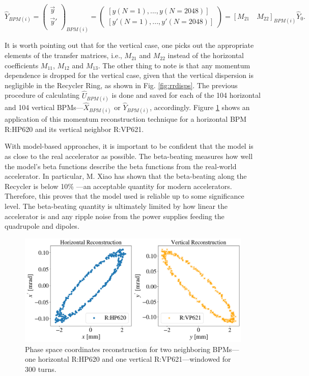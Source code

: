 \begin{equation}
    \label{eq:ybpmi}
    \hat{Y}_{BPM(i)} = \begin{pmatrix}
        \vec{y} \\
        \vec{y}' \\
    \end{pmatrix}_{BPM(i)}=
    \begin{pmatrix}
        \left[ y(N=1),...,y(N=2048) \right] \\
        \left[ y'(N=1),..., y'(N=2048) \right] 
    \end{pmatrix}
    = \left[ M_{21} \quad M_{22} \right]_{BPM(i)} \hat{Y}_0.  
\end{equation}

It is worth pointing out that for the vertical case, one picks out the appropriate elements of the transfer matrices, i.e., $M_{21}$ and $M_{22}$ instead of the horizontal coefficients $M_{11}$, $M_{12}$ and $M_{13}$. The other thing to note is that any momentum dependence is dropped for the vertical case, given that the vertical dispersion is negligible in the Recycler Ring, as shown in Fig. \ref{fig:rrdisps}. The previous procedure of calculating $\hat{U}_{BPM(i)}$ is done and saved for each of the 104 horizontal and 104 vertical BPMs---$\hat{X}_{BPM(i)}$ or $\hat{Y}_{BPM(i)}$, accordingly. Figure \ref{fig:momentum} shows an application of this momentum reconstruction technique for a horizontal BPM R:HP620 and its vertical neighbor R:VP621. 

With model-based approaches, it is important to be confident that the model is as close to the real accelerator as possible. The beta-beating measures how well the model's beta functions describe the beta functions from the real-world accelerator. In particular, M. Xiao has shown that the beta-beating along the Recycler is below 10\% \cite{rr3}---an acceptable quantity for modern accelerators. Therefore, this proves that the model used is reliable up to some significance level. The beta-beating quantity is ultimately limited by how linear the accelerator is and any ripple noise from the power supplies feeding the quadrupole and dipoles.

\begin{figure}[H]
    \centering
    \includegraphics[width=\columnwidth]{chapter4/momentum.png}
    \caption{Phase space coordinates reconstruction for two neighboring BPMs---one horizontal R:HP620 and one vertical R:VP621---windowed for 300 turns.}
    \label{fig:momentum}
\end{figure}

